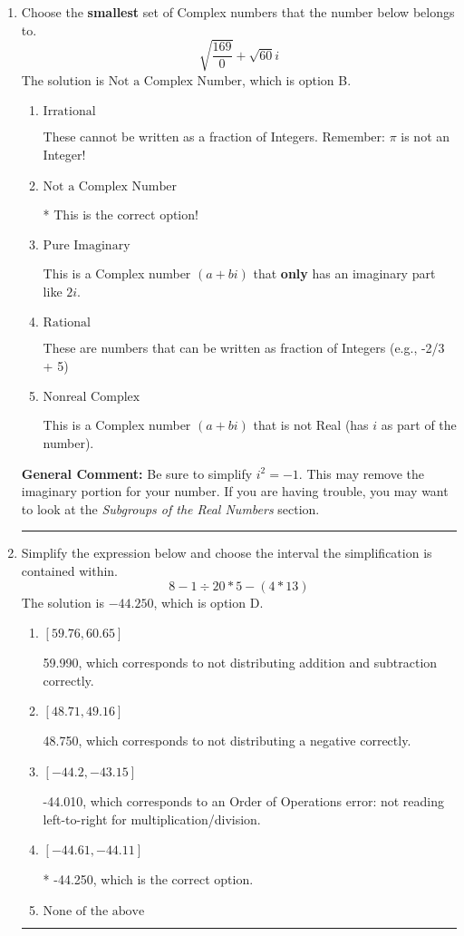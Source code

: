 \documentclass{extbook}[14pt]
\newcommand{\litem}[1]{\item #1

\rule{\textwidth}{0.4pt}}
\begin{document}
\begin{enumerate}\litem{
Choose the \textbf{smallest} set of Complex numbers that the number below belongs to.
\[ \sqrt{\frac{169}{0}}+\sqrt{60} i \]The solution is \( \text{Not a Complex Number} \), which is option B.\begin{enumerate}[label=\Alph*.]
\item \( \text{Irrational} \)

These cannot be written as a fraction of Integers. Remember: $\pi$ is not an Integer!
\item \( \text{Not a Complex Number} \)

* This is the correct option!
\item \( \text{Pure Imaginary} \)

This is a Complex number $(a+bi)$ that \textbf{only} has an imaginary part like $2i$.
\item \( \text{Rational} \)

These are numbers that can be written as fraction of Integers (e.g., -2/3 + 5)
\item \( \text{Nonreal Complex} \)

This is a Complex number $(a+bi)$ that is not Real (has $i$ as part of the number).
\end{enumerate}

\textbf{General Comment:} Be sure to simplify $i^2 = -1$. This may remove the imaginary portion for your number. If you are having trouble, you may want to look at the \textit{Subgroups of the Real Numbers} section.
}
\litem{
Simplify the expression below and choose the interval the simplification is contained within.
\[ 8 - 1 \div 20 * 5 - (4 * 13) \]The solution is \( -44.250 \), which is option D.\begin{enumerate}[label=\Alph*.]
\item \( [59.76, 60.65] \)

 59.990, which corresponds to not distributing addition and subtraction correctly.
\item \( [48.71, 49.16] \)

 48.750, which corresponds to not distributing a negative correctly.
\item \( [-44.2, -43.15] \)

 -44.010, which corresponds to an Order of Operations error: not reading left-to-right for multiplication/division.
\item \( [-44.61, -44.11] \)

* -44.250, which is the correct option.
\item \( \text{None of the above} \)


\end{enumerate}}
\end{enumerate}
\end{document}
